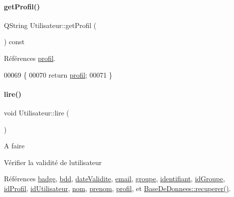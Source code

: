 \paragraph{\texorpdfstring{get\+Profil()}{getProfil()}}
{\footnotesize\ttfamily Q\+String Utilisateur\+::get\+Profil (\begin{DoxyParamCaption}{ }\end{DoxyParamCaption}) const}



Références \hyperlink{class_utilisateur_ab03707f32fadf99ae0a0a27d59470646}{profil}.


\begin{DoxyCode}
00069 \{
00070     \textcolor{keywordflow}{return} \hyperlink{class_utilisateur_ab03707f32fadf99ae0a0a27d59470646}{profil};
00071 \}
\end{DoxyCode}
\mbox{\label{class_utilisateur_aa7d1a92ff4e06e9d302369f6c48884e1}} 
\paragraph{\texorpdfstring{lire()}{lire()}}
{\footnotesize\ttfamily void Utilisateur\+::lire (\begin{DoxyParamCaption}{ }\end{DoxyParamCaption})\hspace{0.3cm}{\ttfamily [private]}}

\begin{DoxyRefDesc}{A faire}
\item[\hyperlink{todo__todo000003}{A faire}]Vérifier la validité de l\textquotesingle{}utilisateur \end{DoxyRefDesc}


Références \hyperlink{class_utilisateur_a77b48aa9d1f0ec04c69d45476897fec6}{badge}, \hyperlink{class_utilisateur_a94fa14e95bd90358fb67eca0170e1724}{bdd}, \hyperlink{class_utilisateur_a898cd6f5a64d733ad49a8a74388326cd}{date\+Validite}, \hyperlink{class_utilisateur_a2f45443ce5277a5e6baefe5121e66555}{email}, \hyperlink{class_utilisateur_af795d9518a4eebe00c5b24937732ab2b}{groupe}, \hyperlink{class_utilisateur_a1e79e47202a2c716346f47adbbeb2511}{identifiant}, \hyperlink{class_utilisateur_a13c3425772da1d5501e6fe4a2f2b8194}{id\+Groupe}, \hyperlink{class_utilisateur_a042947e8b86637d1eb012c3fc89a959e}{id\+Profil}, \hyperlink{class_utilisateur_ae1763e7a52c82c63506bc4160cdabb20}{id\+Utilisateur}, \hyperlink{class_utilisateur_a1096e809aca4b7cf453a7af93cb72502}{nom}, \hyperlink{class_utilisateur_a1dd0779807b19298f30f39d9c371170f}{prenom}, \hyperlink{class_utilisateur_ab03707f32fadf99ae0a0a27d59470646}{profil}, et \hyperlink{class_base_de_donnees_a77539baad389f5acf754cd2cd452403e}{Base\+De\+Donnees\+::recuperer()}.




